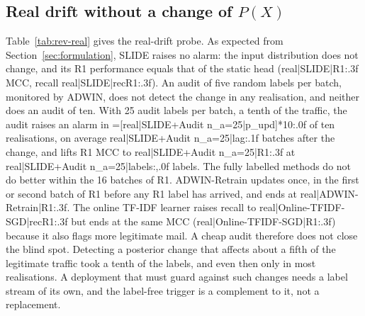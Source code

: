 {{{{{{

\subsection{Real drift without a change of $P(X)$}\label{sec:realdrift}
Table~\ref{tab:rev-real} gives the real-drift probe. As expected from Section~\ref{sec:formulation}, SLIDE raises no alarm: the input distribution does not change, and its R1 performance equals that of the static head ({{real|SLIDE|R1:.3f}} MCC, recall {{real|SLIDE|recR1:.3f}}). An audit of five random labels per batch, monitored by ADWIN, does not detect the change in any realisation, and neither does an audit of ten. With 25 audit labels per batch, a tenth of the traffic, the audit raises an alarm in {{=[real|SLIDE+Audit n_a=25|p_upd]*10:.0f}} of ten realisations, on average {{real|SLIDE+Audit n_a=25|lag:.1f}} batches after the change, and lifts R1 MCC to {{real|SLIDE+Audit n_a=25|R1:.3f}} at {{real|SLIDE+Audit n_a=25|labels:,.0f}} labels. The fully labelled methods do not do better within the 16 batches of R1. ADWIN-Retrain updates once, in the first or second batch of R1 before any R1 label has arrived, and ends at {{real|ADWIN-Retrain|R1:.3f}}. The online TF-IDF learner raises recall to {{real|Online-TFIDF-SGD|recR1:.3f}} but ends at the same MCC ({{real|Online-TFIDF-SGD|R1:.3f}}) because it also flags more legitimate mail. A cheap audit therefore does not close the blind spot. Detecting a posterior change that affects about a fifth of the legitimate traffic took a tenth of the labels, and even then only in most realisations. A deployment that must guard against such changes needs a label stream of its own, and the label-free trigger is a complement to it, not a replacement.



}}}}}}
